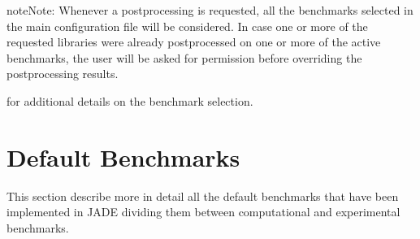 \documentclass[letterpaper,10pt,english]{sphinxmanual}
\begin{document}
\begin{sphinxadmonition}{note}{Note:}
\sphinxAtStartPar
Whenever a post\sphinxhyphen{}processing is requested, all the benchmarks selected in the main configuration file will be considered.
In case one or more of the requested libraries were already post\sphinxhyphen{}processed on one or more of the active benchmarks,
the user will be asked for permission before overriding the post\sphinxhyphen{}processing results.
\end{sphinxadmonition}


\nopagebreak


\sphinxAtStartPar
{\hyperref[\detokenize{usage/configuration:config}]{}} for additional details on the benchmark selection.




\chapter{Default Benchmarks}
\label{\detokenize{usage/benchmarks:default-benchmarks}}\label{\detokenize{usage/benchmarks::doc}}
\sphinxAtStartPar
This section describe more in detail all the default benchmarks
that have been implemented in JADE dividing them between
computational and experimental benchmarks.
\end{document}
